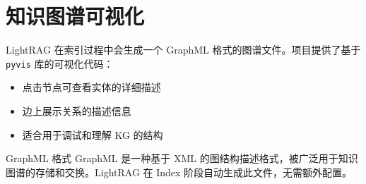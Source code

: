 \section{知识图谱可视化}

LightRAG 在索引过程中会生成一个 GraphML 格式的图谱文件。项目提供了基于 \texttt{pyvis} 库的可视化代码：

\begin{itemize}
    \item 点击节点可查看实体的详细描述
    \item 边上展示关系的描述信息
    \item 适合用于调试和理解 KG 的结构
\end{itemize}

\begin{knowledgebox}{GraphML 格式}
GraphML 是一种基于 XML 的图结构描述格式，被广泛用于知识图谱的存储和交换。LightRAG 在 Index 阶段自动生成此文件，无需额外配置。
\end{knowledgebox}


